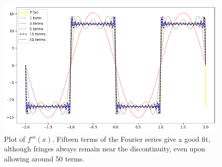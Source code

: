 \documentclass[10pt]{article}
\begin{document}
        \begin{figure}
                \centering        
                \includegraphics[width=\textwidth]{./7_f3.png}
                \caption{Plot of $f'''(x)$. Fifteen terms of the Fourier series give a good fit, although fringes always remain near the discontinuity,
                        even upon allowing around 50 terms.}              
        \end{figure}
\end{document}
